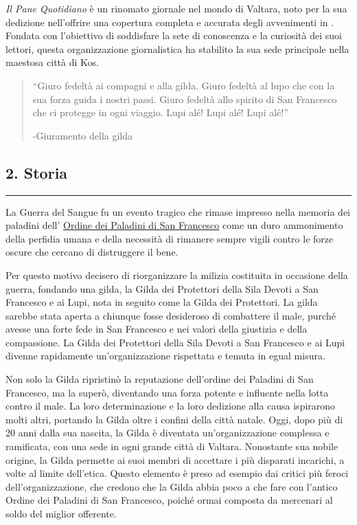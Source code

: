 \emph{Il Pane Quotidiano} è un rinomato giornale nel mondo di Valtara,
noto per la sua dedizione nell'offrire una copertura completa e accurata
degli avvenimenti in . Fondata con l'obiettivo di soddisfare la sete di
conoscenza e la curiosità dei suoi lettori, questa organizzazione
giornalistica ha stabilito la sua sede principale nella maestosa città
di Kos.

\begin{quote}
``Giuro fedeltà ai compagni e alla gilda. Giuro fedeltà al lupo che con
la sua forza guida i nostri passi. Giuro fedeltà allo spirito di San
Francesco che ci protegge in ogni viaggio. Lupi alé! Lupi alé! Lupi
alé!''

-Giuramento della gilda
\end{quote}

\subsection{2. Storia}\label{storia}

\begin{center}\rule{0.5\linewidth}{0.5pt}\end{center}

La Guerra del Sangue fu un evento tragico che rimase impresso nella
memoria dei paladini dell'
\href{Ordine\%20dei\%20Paladini\%20di\%20San\%20Francesco\%20e8fd423783714ddeb11ec757edea519b.md}{Ordine
dei Paladini di San Francesco} come un duro ammonimento della perfidia
umana e della necessità di rimanere sempre vigili contro le forze oscure
che cercano di distruggere il bene.

Per questo motivo decisero di riorganizzare la milizia costituita in
occasione della guerra, fondando una gilda, la Gilda dei Protettori
della Sila Devoti a San Francesco e ai Lupi, nota in seguito come la
Gilda dei Protettori. La gilda sarebbe stata aperta a chiunque fosse
desideroso di combattere il male, purché avesse una forte fede in San
Francesco e nei valori della giustizia e della compassione. La Gilda dei
Protettori della Sila Devoti a San Francesco e ai Lupi divenne
rapidamente un'organizzazione rispettata e temuta in egual misura.

Non solo la Gilda ripristinò la reputazione dell'ordine dei Paladini di
San Francesco, ma la superò, diventando una forza potente e influente
nella lotta contro il male. La loro determinazione e la loro dedizione
alla causa ispirarono molti altri, portando la Gilda oltre i confini
della città natale. Oggi, dopo più di 20 anni dalla sua nascita, la
Gilda è diventata un'organizzazione complessa e ramificata, con una sede
in ogni grande città di Valtara. Nonostante sua nobile origine, la Gilda
permette ai suoi membri di accettare i più disparati incarichi, a volte
al limite dell'etica. Questo elemento è preso ad esempio dai critici più
feroci dell'organizzazione, che credono che la Gilda abbia poco a che
fare con l'antico Ordine dei Paladini di San Francesco, poiché ormai
composta da mercenari al soldo del miglior offerente.


